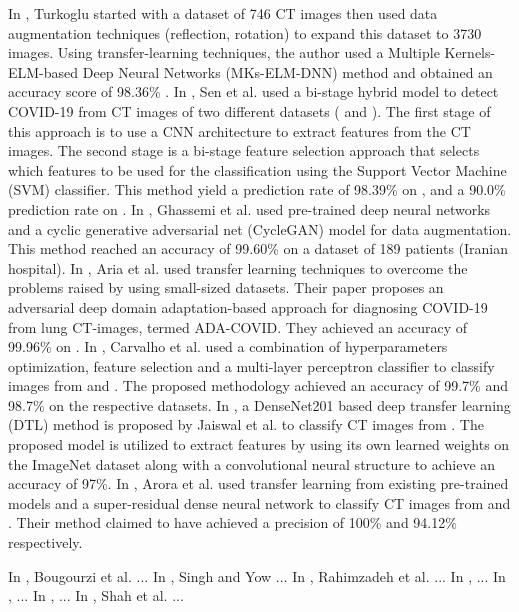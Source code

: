 \documentclass[12pt, letterpaper]{article}
\begin{document}
In \cite{Turkoglu_2021}, Turkoglu started with a dataset of 746 CT images then used data augmentation techniques (reflection, rotation) to expand this dataset to 3730 images. Using transfer-learning techniques, the author used a Multiple Kernels-ELM-based Deep Neural Networks (MKs-ELM-DNN) method and obtained an accuracy score of 98.36\% \cite{Turkoglu_2021}.
In \cite{Sen_2021}, Sen et al. used a bi-stage hybrid model to detect COVID-19 from CT images of two different datasets (\cite{Angelov_2020} and \cite{Zhao_2020}). The first stage of this approach is to use a CNN architecture to extract features from the CT images. The second stage is a bi-stage feature selection approach that selects which features to be used for the classification using the Support Vector Machine (SVM) classifier. This method yield a prediction rate of 98.39\% on \cite{Angelov_2020}, and a 90.0\% prediction rate on \cite{Zhao_2020}.
In \cite{Ghassemi_2021}, Ghassemi et al. used pre-trained deep neural networks and a cyclic generative adversarial net (CycleGAN) model for data augmentation. This method reached an accuracy of 99.60\% on a dataset of 189 patients (Iranian hospital). 
In \cite{Aria_2022}, Aria et al. used transfer learning techniques to overcome the problems raised by using small-sized datasets. Their paper proposes an adversarial deep domain adaptation-based approach for diagnosing COVID-19 from lung CT-images, termed ADA-COVID. They achieved an accuracy of 99.96\% on \cite{Angelov_2020}. 
In \cite{Carvalho_2021}, Carvalho et al. used a combination of hyperparameters optimization, feature selection and a multi-layer perceptron classifier to classify images from \cite{Angelov_2020} and \cite{Zhao_2020}. The proposed methodology achieved an accuracy of 99.7\% and 98.7\% on the respective datasets.
In \cite{Jaiswal_2020}, a DenseNet201 based deep transfer learning (DTL) method is proposed by Jaiswal et al. to classify CT images from \cite{Angelov_2020}. The proposed model is utilized to extract features by using its own learned weights on the ImageNet dataset along with a convolutional neural structure to achieve an accuracy of 97\%.
In \cite{Arora_2021}, Arora et al. used transfer learning from existing pre-trained models and a super-residual dense neural network to classify CT images from \cite{Angelov_2020} and \cite{Zhao_2020}. Their method claimed to have achieved a precision of 100\% and 94.12\% respectively.


In \cite{Bougourzi_2021}, Bougourzi et al. ...
In \cite{Singh_2021}, Singh and Yow ...
In \cite{Rahimzadeh_2021}, Rahimzadeh et al. ...
In \cite{Yang_2022}, ...
In \cite{Loey_2020}, ...
In \cite{Alshazly_2020}, ...
In \cite{Shah_2021}, Shah et al. ...
\end{document}
